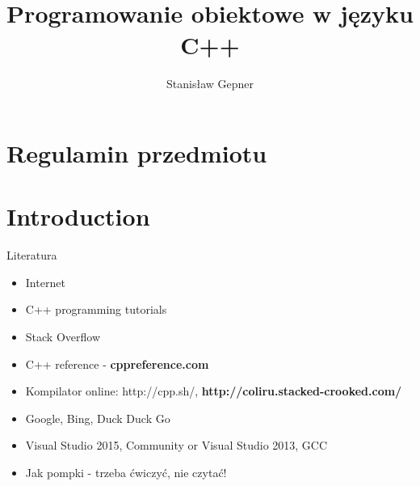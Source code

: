 \documentclass[10pt]{beamer}
\title{Programowanie obiektowe w języku C++}
\author[shortname]{Stanis{\l}aw Gepner}
\institute[shortinst]{sgepner@meil.pw.edu.pl}
\date{}
\begin{document}
\frame{
    \titlepage
}

\section{Regulamin przedmiotu}

%


\section{Introduction}

\begin{frame}{Literatura}
  \begin{itemize}
    \item Internet
    \item C++ programming tutorials
    \item Stack Overflow
    \item C++ reference - {\color{red} \bf cppreference.com}
    \item Kompilator online: http://cpp.sh/, {\color{red} \bf http://coliru.stacked-crooked.com/}
    \item Google, Bing, Duck Duck Go
    \item Visual Studio 2015, Community or Visual Studio 2013, GCC
    \item Jak pompki - trzeba ćwiczyć, nie czytać!
  \end{itemize}
\end{frame}
\end{document}
